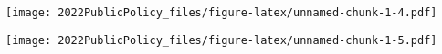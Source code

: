 \documentclass[
]{article}
\newenvironment{Shaded}{\begin{snugshade}}{\end{snugshade}}
\newcommand{\AttributeTok}[1]{\textcolor[rgb]{0.77,0.63,0.00}{#1}}
\newcommand{\DecValTok}[1]{\textcolor[rgb]{0.00,0.00,0.81}{#1}}
\newcommand{\FunctionTok}[1]{\textcolor[rgb]{0.00,0.00,0.00}{#1}}
\newcommand{\NormalTok}[1]{#1}
\newcommand{\SpecialCharTok}[1]{\textcolor[rgb]{0.00,0.00,0.00}{#1}}
\newcommand{\StringTok}[1]{\textcolor[rgb]{0.31,0.60,0.02}{#1}}
\begin{document}
\texttt{[image: 2022PublicPolicy\_files/figure-latex/unnamed-chunk-1-4.pdf]}

\begin{Shaded}
\end{Shaded}

\texttt{[image: 2022PublicPolicy\_files/figure-latex/unnamed-chunk-1-5.pdf]}
\end{document}
